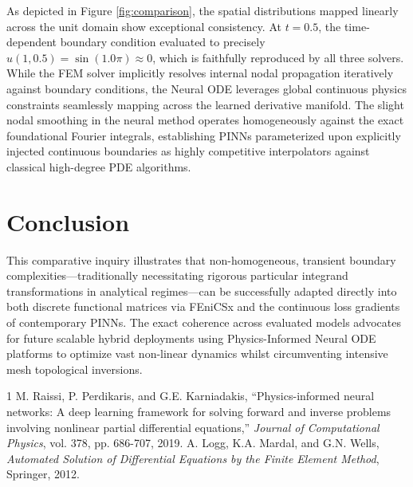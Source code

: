 \documentclass[journal]{IEEEtran}
\begin{document}
As depicted in Figure \ref{fig:comparison}, the spatial distributions mapped linearly across the unit domain show exceptional consistency. At $t=0.5$, the time-dependent boundary condition evaluated to precisely $u(1, 0.5) = \sin(1.0\pi) \approx 0$, which is faithfully reproduced by all three solvers.
While the FEM solver implicitly resolves internal nodal propagation iteratively against boundary conditions, the Neural ODE leverages global continuous physics constraints seamlessly mapping across the learned derivative manifold. The slight nodal smoothing in the neural method operates homogeneously against the exact foundational Fourier integrals, establishing PINNs parameterized upon explicitly injected continuous boundaries as highly competitive interpolators against classical high-degree PDE algorithms.

\section{Conclusion}
This comparative inquiry illustrates that non-homogeneous, transient boundary complexities---traditionally necessitating rigorous particular integrand transformations in analytical regimes---can be successfully adapted directly into both discrete functional matrices via FEniCSx and the continuous loss gradients of contemporary PINNs. The exact coherence across evaluated models advocates for future scalable hybrid deployments using Physics-Informed Neural ODE platforms to optimize vast non-linear dynamics whilst circumventing intensive mesh topological inversions.

\begin{thebibliography}{1}
M. Raissi, P. Perdikaris, and G.E. Karniadakis, ``Physics-informed neural networks: A deep learning framework for solving forward and inverse problems involving nonlinear partial differential equations,'' \emph{Journal of Computational Physics}, vol. 378, pp. 686-707, 2019.
A. Logg, K.A. Mardal, and G.N. Wells, \emph{Automated Solution of Differential Equations by the Finite Element Method}, Springer, 2012.
\end{thebibliography}
\end{document}
